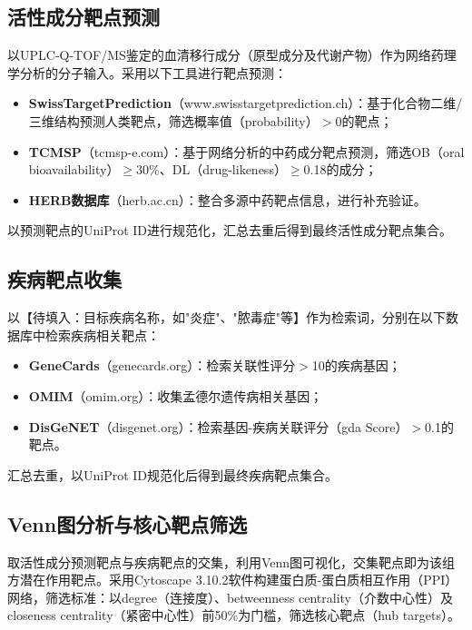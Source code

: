 \documentclass[12pt,a4paper,UTF8,openany]{ctexbook}
\begin{document}
\subsection{活性成分靶点预测}

以UPLC-Q-TOF/MS鉴定的血清移行成分（原型成分及代谢产物）作为网络药理学分析的分子输入。采用以下工具进行靶点预测：

\begin{itemize}
  \item \textbf{SwissTargetPrediction}（www.swisstargetprediction.ch）：基于化合物二维/三维结构预测人类靶点，筛选概率值（probability）$>$0的靶点；
  \item \textbf{TCMSP}（tcmsp-e.com）：基于网络分析的中药成分靶点预测，筛选OB（oral bioavailability）$\geq$30\%、DL（drug-likeness）$\geq$0.18的成分；
  \item \textbf{HERB数据库}（herb.ac.cn）：整合多源中药靶点信息，进行补充验证。
\end{itemize}

以预测靶点的UniProt ID进行规范化，汇总去重后得到最终活性成分靶点集合。

\subsection{疾病靶点收集}

以【待填入：目标疾病名称，如"炎症"、"脓毒症"等】作为检索词，分别在以下数据库中检索疾病相关靶点：

\begin{itemize}
  \item \textbf{GeneCards}（genecards.org）：检索关联性评分$>$10的疾病基因；
  \item \textbf{OMIM}（omim.org）：收集孟德尔遗传病相关基因；
  \item \textbf{DisGeNET}（disgenet.org）：检索基因-疾病关联评分（gda Score）$>$0.1的靶点。
\end{itemize}

汇总去重，以UniProt ID规范化后得到最终疾病靶点集合。

\subsection{Venn图分析与核心靶点筛选}

取活性成分预测靶点与疾病靶点的交集，利用Venn图可视化，交集靶点即为该组方潜在作用靶点。采用Cytoscape 3.10.2软件构建蛋白质-蛋白质相互作用（PPI）网络，筛选标准：以degree（连接度）、betweenness centrality（介数中心性）及closeness centrality（紧密中心性）前50\%为门槛，筛选核心靶点（hub targets）。
\end{document}
